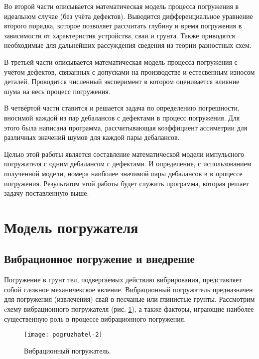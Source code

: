 Во второй части описывается математическая модель процесса погружения в идеальном случае (без учёта дефектов).
Выводится дифференциальное уравнение второго порядка, которое позволяет рассчитать глубину и время
погружения в зависимости от характеристик устройства, сваи и грунта.
Также приводятся необходимые для дальнейших рассуждения сведения из теории разностных схем.

В третьей части описывается математическая модель процесса погружения с учётом дефектов, связанных с допусками
на производстве и естесвенным износом деталей. Проводится численный эксперимент в котором оценивается влияние
шума на весь процесс погружения.

В четвёртой части ставится и решается задача по определению погрешности, вносимой
каждой из пар дебалансов с дефектами в процесс погружения. Для этого была написана программа,
рассчитывающая коэффициент ассиметрии для различных значений шумов для каждой пары дебалансов.

Целью этой работы является составление математической модели импульсного погружателя с одним дебалансом с дефектами.
И определение, с использованием полученной модели, номера наиболее значимой пары дебалансов в в процессе погружения.
Результатом этой работы будет служить программа, которая решает задачу поставленную выше.

\clearpage

\section{Модель погружателя}

\subsection{Вибрационное погружение и внедрение}

Погружение в грунт тел, подвергаемых действию вибрирования, представляет собой сложное механичекское явление. Вибрационный
погружатель предназначен для погружения (извлечения) свай в песчаные или глинистые грунты. Рассмотрим cхему вибрационного
погружателя (рис. \ref{fig:vp}), а также факторы, играющие наиболее существенную роль в процессе вибрационного погружения.

\begin{figure}[h]
    \centering
    \texttt{[image: pogruzhatel-2]}
    \caption{Вибрационный погружатель.}
    \label{fig:vp}
\end{figure}

